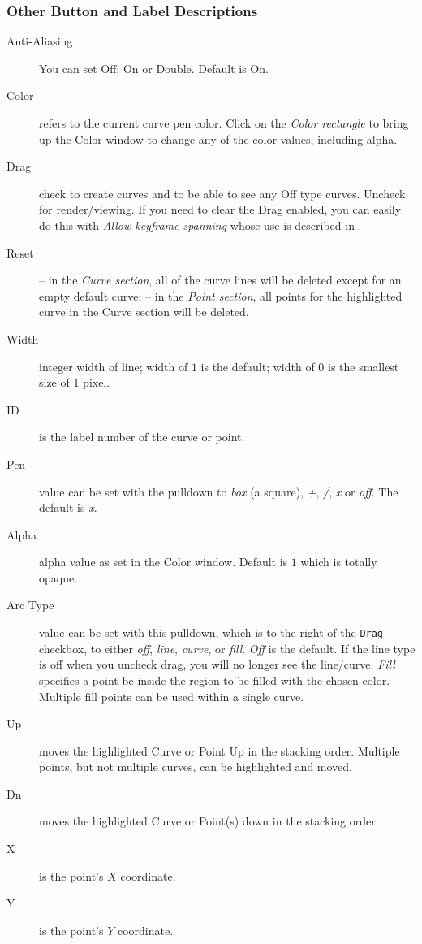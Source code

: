 \subsubsection*{Other Button and Label Descriptions}%
\label{ssub:other_button_label_description}

\begin{description}
	\item[Anti-Aliasing] You can set Off; On or Double. Default is On.
    \item[Color] refers to the current curve pen color. Click on the \textit{Color rectangle} to bring up the Color window to change any of the color values, including alpha.
    \item[Drag] check to create curves and to be able to see any Off type curves. Uncheck for render/viewing.  If you need to clear the Drag enabled, you can easily do this with \textit{Allow keyframe spanning} whose use is described in .
    \item[Reset] -- in the \textit{Curve section}, all of the curve lines will be deleted except for an empty default curve;
    -- in the \textit{Point section}, all points for the highlighted curve in the Curve section will be deleted.
    \item[Width] integer width of line; width of $1$ is the default; width of $0$ is the smallest size of $1$ pixel.
    \item[ID] is the label number of the curve or point.
    \item[Pen] value can be set with the pulldown to \textit{box} (a square), \textit{+}, \textit{/}, \textit{x} or \textit{off}. The default is \textit{x}.
    \item[Alpha] alpha value as set in the Color window. Default is $1$ which is totally opaque.
    \item[Arc Type] value can be set with this pulldown, which is to the right of the \texttt{Drag} checkbox, to either \textit{off}, \textit{line}, \textit{curve}, or \textit{fill}. \textit{Off} is the default. If the line type is off when you uncheck drag, you will no longer see the line/curve. \textit{Fill} specifies a point be inside the region to be filled with the chosen color. Multiple fill points can be used within a single curve.
    \item[Up] moves the highlighted Curve or Point Up in the stacking order. Multiple points, but not multiple curves, can be highlighted and moved.
    \item[Dn] moves the highlighted Curve or Point(s) down in the stacking order.
    \item[X] is the point’s $X$ coordinate.
    \item[Y] is the point’s $Y$ coordinate.
\end{description}

